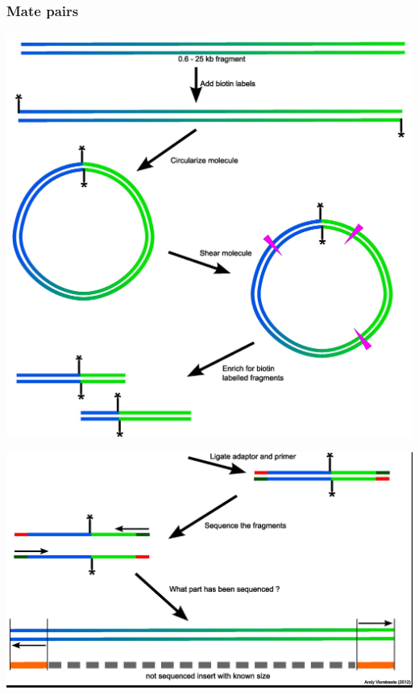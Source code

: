 \begin{frame}[fragile]
\frametitle{Mate pairs}
\begin{minipage}{.48\textwidth}
\includegraphics[width=\textwidth]{figures/mate-pairs-1.png}
\end{minipage}\hfill%
\begin{minipage}{.48\textwidth}
\includegraphics[width=\textwidth]{figures/mate-pairs-2.png}
\end{minipage}
\end{frame}

